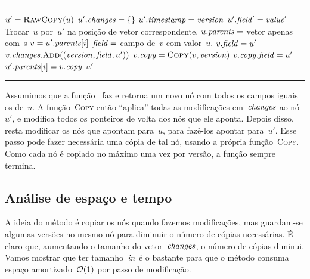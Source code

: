 \documentclass[../../main.tex]{subfiles}
\begin{document}
\vspace{1em}
\hrule
\begin{algorithmic}[1]

	\State $u' = \Call{RawCopy}{u}$
	\State $u'.\mathit{changes} = \{\}$
	\State $u'.\mathit{timestamp} = \mathit{version}$
		\State $u'.\mathit{field}' = \mathit{value}'$
	\EndFor
		\State Trocar~$u$ por~$u'$ na posição de vetor correspondente.
	\EndIf
			\State {}
		\EndIf
	\EndFor
	\State $u.\mathit{parents} = $ vetor apenas com~s
	 \label{line:copy:parents}
		\State $v = u'.\mathit{parents}[i]$
		\State $\mathit{field} = $ campo de~$v$ com valor~$u$.
		 
			\State $v.\mathit{field} = u'$
			\State $v.\V{changes}.\Call{Add}{(\V{version}, \V{field}, u')}$
		\Else
			\State $v.\V{copy} = \Call{Copy}{v, \V{version}}$ \label{line:copy:copy}
			\State $v.\mathit{copy}.\mathit{field} = u'$
			\State $u'.\mathit{parents}[i] = v.\mathit{copy}$
		\EndIf
	\EndFor
	\State \Return $u'$
\EndFunction

\end{algorithmic}
\hrule
\vspace{1em}

Assumimos que a função~ faz e retorna um novo nó com todos os campos iguais os de~$u$.
A função~\textsc{Copy} então ``aplica'' todas as modificações em~$\mathit{changes}$ ao nó~$u'$, e modifica todos os ponteiros de volta dos nós que ele aponta. Depois disso, resta modificar os nós que apontam para~$u$, para fazê-los apontar para~$u'$. Esse passo pode fazer necessária uma cópia de tal nó, usando a própria função~\textsc{Copy}. Como cada nó é copiado no máximo uma vez por versão, a função sempre termina.

\subsection{Análise de espaço e tempo}

A ideia do método é copiar os nós quando fazemos modificações, mas guardam-se algumas versões no mesmo nó para diminuir o número de cópias necessárias. É claro que, aumentando o tamanho do vetor~$\mathit{changes}$, o número de cópias diminui. Vamos mostrar que ter tamanho~$\mathit{in}$ é o bastante para que o método consuma espaço amortizado~$\mathcal{O}(1)$ por passo de modificação.
\end{document}
